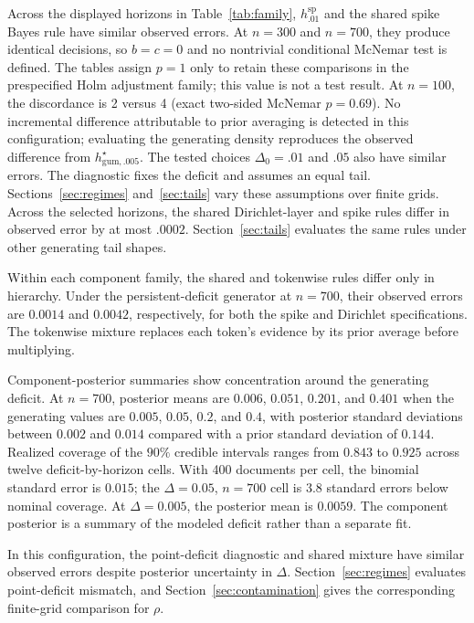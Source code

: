 \documentclass[11pt]{article}
\begin{document}
Across the displayed horizons in Table~\ref{tab:family}, $h^{\mathrm{sp}}_{.01}$ and the shared spike Bayes rule have similar observed errors.  At $n=300$ and $n=700$, they produce identical decisions, so $b=c=0$ and no nontrivial conditional McNemar test is defined.  The tables assign $p=1$ only to retain these comparisons in the prespecified Holm adjustment family; this value is not a test result.  At $n=100$, the discordance is 2 versus 4 (exact two-sided McNemar $p=0.69$).  No incremental difference attributable to prior averaging is detected in this configuration; evaluating the generating density reproduces the observed difference from $h^\star_{\mathrm{gum},.005}$.  The tested choices $\Delta_0=.01$ and $.05$ also have similar errors.  The diagnostic fixes the deficit and assumes an equal tail.  Sections~\ref{sec:regimes} and~\ref{sec:tails} vary these assumptions over finite grids.
Across the selected horizons, the shared Dirichlet-layer and spike rules differ in observed error by at most $.0002$.  Section~\ref{sec:tails} evaluates the same rules under other generating tail shapes.

Within each component family, the shared and tokenwise rules differ only in hierarchy.  Under the persistent-deficit generator at $n=700$, their observed errors are $0.0014$ and $0.0042$, respectively, for both the spike and Dirichlet specifications.  The tokenwise mixture replaces each token's evidence by its prior average before multiplying.

Component-posterior summaries show concentration around the generating deficit.  At $n=700$, posterior means are $0.006$, $0.051$, $0.201$, and $0.401$ when the generating values are $0.005$, $0.05$, $0.2$, and $0.4$, with posterior standard deviations between $0.002$ and $0.014$ compared with a prior standard deviation of $0.144$.  Realized coverage of the $90\%$ credible intervals ranges from $0.843$ to $0.925$ across twelve deficit-by-horizon cells.  With 400 documents per cell, the binomial standard error is $0.015$; the $\Delta=0.05$, $n=700$ cell is $3.8$ standard errors below nominal coverage.  At $\Delta=0.005$, the posterior mean is $0.0059$.  The component posterior is a summary of the modeled deficit rather than a separate fit.

In this configuration, the point-deficit diagnostic and shared mixture have similar observed errors despite posterior uncertainty in $\Delta$.  Section~\ref{sec:regimes} evaluates point-deficit mismatch, and Section~\ref{sec:contamination} gives the corresponding finite-grid comparison for $\rho$.
\end{document}
